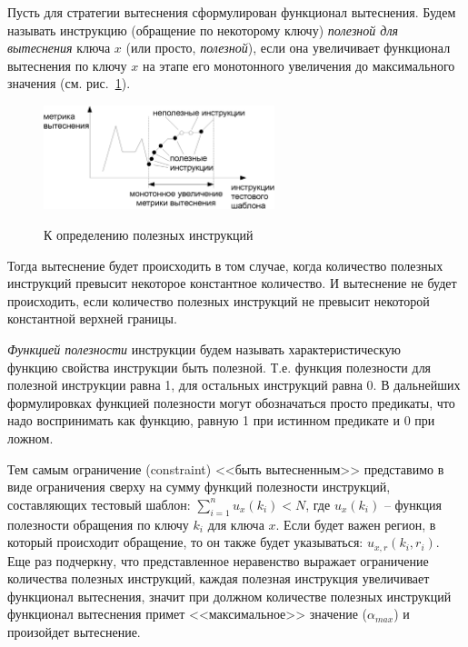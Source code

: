 Пусть для стратегии вытеснения сформулирован функционал вытеснения. Будем называть
инструкцию (обращение по некоторому ключу) \emph{полезной для вытеснения} ключа
$x$ (или просто, \emph{полезной}), если она увеличивает функционал вытеснения по
ключу $x$ на этапе его монотонного увеличения до максимального значения (см.
рис.~\ref{useful}).

\begin{figure}[h] \center
  \includegraphics[width=0.6\textwidth]{2.theor/useful}\\
  \caption{К определению полезных инструкций}\label{useful}
\end{figure}

Тогда вытеснение будет происходить в том случае, когда количество
полезных инструкций превысит некоторое константное количество.
И вытеснение не будет происходить, если количество полезных инструкций
не превысит некоторой константной верхней границы.

\emph{Функцией полезности} инструкции будем называть характеристическую\\ функцию
свойства инструкции быть полезной. Т.е. функция полезности для полезной
инструкции равна 1, для остальных инструкций равна 0. В дальнейших формулировках
функцией полезности могут обозначаться просто предикаты, что надо воспринимать
как функцию, равную 1 при истинном предикате и 0 при ложном.

Тем самым ограничение (constraint) <<быть вытесненным>> представимо в виде
ограничения сверху на сумму функций полезности инструкций, составляющих тестовый
шаблон: $\sum_{i=1}^n u_x(k_i) < N$, где $u_x(k_i)$ -- функция полезности
обращения по ключу $k_i$ для ключа $x$. Если будет важен регион, в который
происходит обращение, то он также будет указываться: $u_{x,r}(k_i, r_i)$. Еще
раз подчеркну, что представленное неравенство выражает ограничение количества
полезных инструкций, каждая полезная инструкция увеличивает функционал вытеснения,
значит при должном количестве полезных инструкций функционал вытеснения примет
<<максимальное>> значение ($\alpha_{max}$) и произойдет вытеснение.

